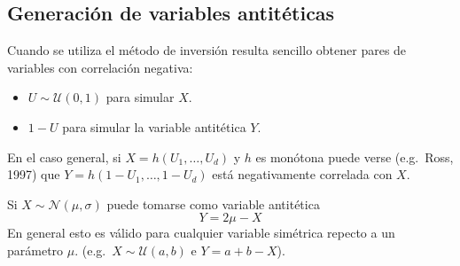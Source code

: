 \documentclass[
]{book}
\theoremstyle{break}
\theoremstyle{nonumberplain}
\begin{document}
\hypertarget{generaciuxf3n-de-variables-antituxe9ticas}{%
\subsection{Generación de variables antitéticas}\label{generaciuxf3n-de-variables-antituxe9ticas}}

Cuando se utiliza el método de inversión resulta sencillo obtener
pares de variables con correlación negativa:

\begin{itemize}
\item
  \(U\sim \mathcal{U}\left( 0,1\right)\) para simular \(X\).
\item
  \(1-U\) para simular la variable antitética \(Y\).
\end{itemize}

En el caso general, si \(X=h\left( U_{1},\ldots,U_{d}\right)\) y
\(h\) es monótona puede verse (e.g.~Ross, 1997) que
\(Y=h\left( 1-U_{1},\ldots,1-U_{d}\right)\) está negativamente
correlada con \(X\).

Si \(X\sim \mathcal{N}(\mu,\sigma)\) puede tomarse como variable
antitética \[Y=2\mu-X\]
En general esto es válido para cualquier variable
simétrica repecto a un parámetro \(\mu\).
(e.g.~\(X\sim \mathcal{U}(a,b)\) e \(Y=a+b-X\)).
\end{document}
